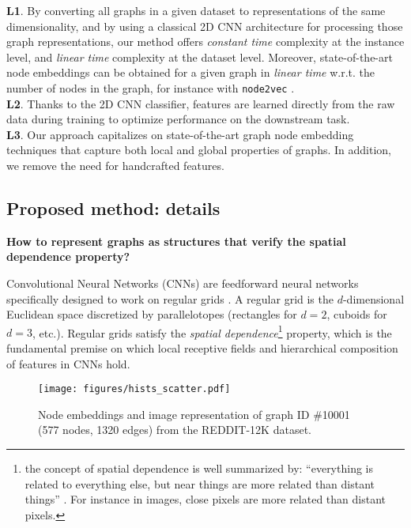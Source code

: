 \documentclass[sigconf]{acmart}
\begin{document}
\textbf{L1}. By converting all graphs in a given dataset to representations of the same dimensionality, and by using a classical 2D CNN architecture for processing those graph representations, our method offers \textit{constant time} complexity at the instance level, and \textit{linear time} complexity at the dataset level. Moreover, state-of-the-art node embeddings can be obtained for a given graph in \textit{linear time} w.r.t. the number of nodes in the graph, for instance with \texttt{node2vec} \citep{grover2016node2vec}. \\
\textbf{L2}. Thanks to the 2D CNN classifier, features are learned directly from the raw data during training to optimize performance on the downstream task. \\
\textbf{L3}. Our approach capitalizes on state-of-the-art graph node embedding techniques that capture both local and global properties of graphs. In addition, we remove the need for handcrafted features.

\subsection{Proposed method: details}

\noindent \textbf{How to represent graphs as structures that verify the spatial dependence property?}
\par Convolutional Neural Networks (CNNs) are feedforward neural networks specifically designed to work on regular grids \citep{lecun1998gradient}. A regular grid is the $d$-dimensional Euclidean space discretized by parallelotopes (rectangles for $d=2$, cuboids for $d=3$, etc.). %
Regular grids satisfy the \textit{spatial dependence}\footnote{\scriptsize{the concept of spatial dependence is well summarized by:
``everything is related to everything else, but near things are more related than distant things'' \citep{tobler1970computer}. For instance in images, close pixels are more related than distant pixels.}} property, which is the fundamental premise on which local receptive fields and hierarchical composition of features in CNNs hold.

\begin{figure*}[!ht]
  \centering
    \texttt{[image: figures/hists\_scatter.pdf]}
\captionsetup{justification=justified,singlelinecheck=false, size=small}
    \caption{Node embeddings and image representation of graph ID \#10001 (577 nodes, 1320 edges) from the REDDIT-12K dataset.}
    \label{fig:hist_scatter}
\end{figure*}
\end{document}
